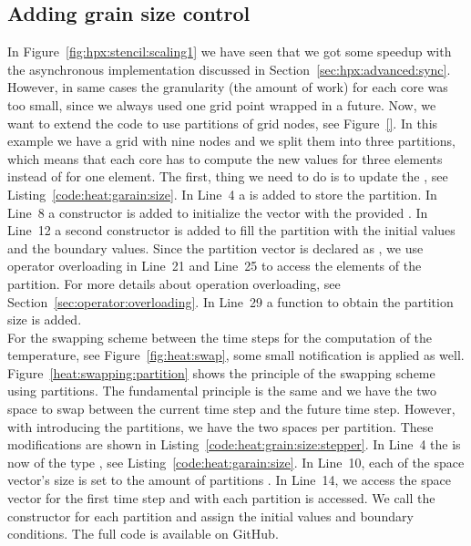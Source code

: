 \subsection{Adding grain size control}
\label{heatequation:serial:grainsize}
In Figure~\ref{fig:hpx:stencil:scaling1} we have seen that we got some speedup with the asynchronous implementation discussed in Section~\ref{sec:hpx:advanced:sync}. However, in same cases the granularity (the amount of work) for each core was too small, since we always used one grid point wrapped in a future. Now, we want to extend the code to use partitions of grid nodes, see Figure~\ref{}. In this example we have a grid with nine nodes and we split them into three partitions, which means that each core has to compute the new values for three elements instead of for one element. The first, thing we need to do is to update the , see Listing~\ref{code:heat:garain:size}. In Line~4 a  is added to store the partition. In Line~8 a constructor is added to initialize the vector  with the provided . In Line~12 a second constructor is added to fill the partition with the initial values and the boundary values. Since the partition vector is declared as , we use operator overloading in Line~21 and Line~25 to access the elements of the partition. For more details about operation overloading, see Section~\ref{sec:operator:overloading}. In Line~29 a function to obtain the partition size is added. \\

For the swapping scheme between the time steps for the computation of the temperature, see Figure~\ref{fig:heat:swap}, some small notification is applied as well. Figure~\ref{heat:swapping:partition} shows the principle of the swapping scheme using partitions. The fundamental principle is the same and we have the two space  to swap between the current time step and the future time step. However, with introducing the partitions, we have the two spaces per partition. These modifications are shown in Listing~\ref{code:heat:grain:size:stepper}. In Line~4 the  is now of the type , see Listing~\ref{code:heat:garain:size}. In Line~10, each of the space vector's size is set to the amount of partitions . In Line~14, we access the space vector  for the first time step and with  each partition is accessed. We call the constructor for each partition and assign the initial values and boundary conditions. The full code is available on GitHub.


